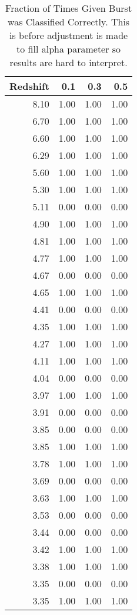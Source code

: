 \begin{table}[H]
\begin{center}
\begin{tabular}{rrrr}
  \hline
Redshift & 0.1 & 0.3 & 0.5 \\ 
  \hline
8.10 & 1.00 & 1.00 & 1.00 \\ 
  6.70 & 1.00 & 1.00 & 1.00 \\ 
  6.60 & 1.00 & 1.00 & 1.00 \\ 
  6.29 & 1.00 & 1.00 & 1.00 \\ 
  5.60 & 1.00 & 1.00 & 1.00 \\ 
  5.30 & 1.00 & 1.00 & 1.00 \\ 
  5.11 & 0.00 & 0.00 & 0.00 \\ 
  4.90 & 1.00 & 1.00 & 1.00 \\ 
  4.81 & 1.00 & 1.00 & 1.00 \\ 
  4.77 & 1.00 & 1.00 & 1.00 \\ 
  4.67 & 0.00 & 0.00 & 0.00 \\ 
  4.65 & 1.00 & 1.00 & 1.00 \\ 
  4.41 & 0.00 & 0.00 & 0.00 \\ 
  4.35 & 1.00 & 1.00 & 1.00 \\ 
  4.27 & 1.00 & 1.00 & 1.00 \\ 
  4.11 & 1.00 & 1.00 & 1.00 \\ 
  4.04 & 0.00 & 0.00 & 0.00 \\ 
  3.97 & 1.00 & 1.00 & 1.00 \\ 
  3.91 & 0.00 & 0.00 & 0.00 \\ 
  3.85 & 0.00 & 0.00 & 0.00 \\ 
  3.85 & 1.00 & 1.00 & 1.00 \\ 
  3.78 & 1.00 & 1.00 & 1.00 \\ 
  3.69 & 0.00 & 0.00 & 0.00 \\ 
  3.63 & 1.00 & 1.00 & 1.00 \\ 
  3.53 & 0.00 & 0.00 & 0.00 \\ 
  3.44 & 0.00 & 0.00 & 0.00 \\ 
  3.42 & 1.00 & 1.00 & 1.00 \\ 
  3.38 & 1.00 & 1.00 & 1.00 \\ 
  3.35 & 0.00 & 0.00 & 0.00 \\ 
  3.35 & 1.00 & 1.00 & 1.00 \\ 
   \hline
\end{tabular}
\caption{Fraction of Times Given Burst was Classified Correctly. This is before adjustment is made to fill alpha parameter so results are hard to interpret.}
\end{center}
\end{table}
